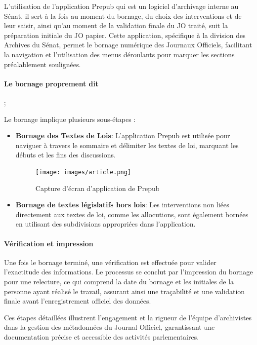 L'utilisation de l'application \gls{Prepub} qui est un logiciel d'archivage interne au Sénat, il sert à la fois au moment du bornage, du choix des interventions et de leur saisir, ainsi qu'au moment de la validation finale du JO traité, suit la préparation initiale du JO papier. Cette application, spécifique à la division des Archives du Sénat, permet le bornage numérique des Journaux Officiels, facilitant la navigation et l'utilisation des menus déroulants pour marquer les sections préalablement soulignées.

\paragraph{Le bornage proprement dit};

Le bornage implique plusieurs sous-étapes :

\begin{itemize}
    \item \textbf{Bornage des Textes de Lois}: L'application Prepub est utilisée pour naviguer à travers le sommaire et délimiter les textes de loi, marquant les débuts et les fins des discussions.

\begin{figure}[H]
    \centering
    \texttt{[image: images/article.png]}
    \caption{Capture d'écran d'application de Prepub}
\end{figure}
    
    \item \textbf{Bornage de textes législatifs hors lois}: Les interventions non liées directement aux textes de loi, comme les allocutions, sont également bornées en utilisant des subdivisions appropriées dans l'application.
\end{itemize}

\paragraph{Vérification et impression}

Une fois le bornage terminé, une vérification est effectuée pour valider l'exactitude des informations. Le processus se conclut par l'impression du bornage pour une relecture, ce qui comprend la date du bornage et les initiales de la personne ayant réalisé le travail, assurant ainsi une traçabilité et une validation finale avant l'enregistrement officiel des données. 

Ces étapes détaillées illustrent l'engagement et la rigueur de l'équipe d'archivistes dans la gestion des métadonnées du Journal Officiel, garantissant une documentation précise et accessible des activités parlementaires.

